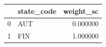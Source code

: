 \begin{tabular}{llr}
\toprule
 & state_code & weight_sc \\
\midrule
0 & AUT & 0.000000 \\
1 & FIN & 1.000000 \\
\bottomrule
\end{tabular}
